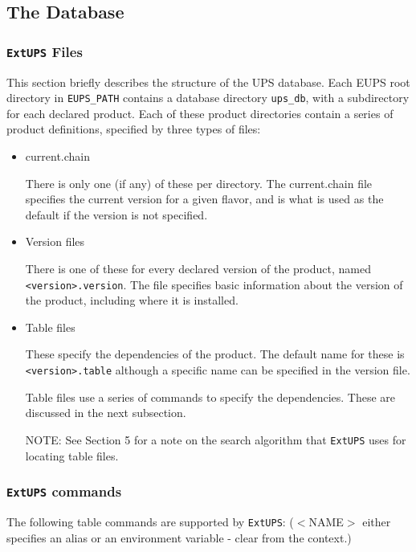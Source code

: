 \documentclass{article}
\newcommand{\code}[1]{\texttt{#1}}
\newcommand{\file}[1]{\texttt{#1}}
\newcommand{\eups}{\code{ExtUPS}}
\begin{document}
\subsection{The Database}

\subsubsection{\eups{} Files}

This section briefly describes the structure of the UPS database. Each
EUPS root directory in \code{EUPS\_PATH} contains a database directory
\code{ups\_db}, with a subdirectory for each declared product.  Each
of these product directories contain a series of product definitions,
specified by three types of files:

\begin{itemize}
  \item current.chain

    There is only one (if any) of these per directory.  The
    current.chain file specifies the current version for a given
    flavor, and is what is used as the default if the version is not
    specified.

  \item Version files

    There is one of these for every declared version of the product,
    named \file{<version>.version}. The file specifies basic information
    about the version of the product, including where it is installed.

  \item Table files

    These specify the dependencies of the product. The default name
    for these is \file{<version>.table} although a specific name can be specified in the
    version file.

    Table files use a series of commands to specify the dependencies. These are
    discussed in the next subsection.

    NOTE: See Section 5 for a note on the search algorithm that \eups{} uses for 
    locating table files.
\end{itemize}

\subsubsection{\eups{} commands}

The following table commands are supported by \eups{}: ($<$NAME$>$ either specifies an
alias or an environment variable - clear from the context.)
\end{document}
